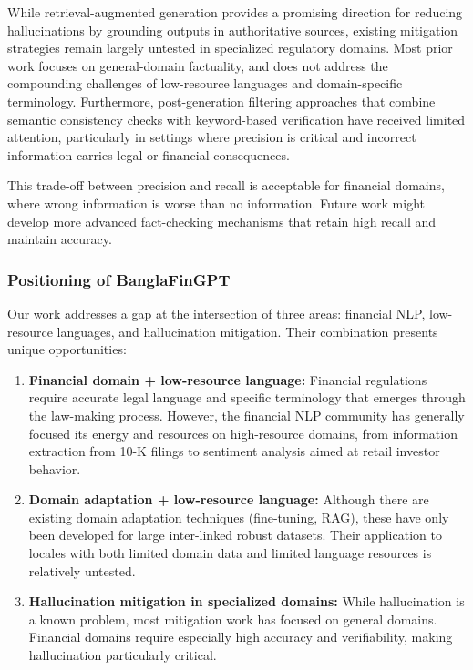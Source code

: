 \documentclass{article}
\begin{document}
While retrieval-augmented generation provides a promising direction for reducing
hallucinations by grounding outputs in authoritative sources, existing mitigation
strategies remain largely untested in specialized regulatory domains. Most prior work
focuses on general-domain factuality, and does not address the compounding challenges
of low-resource languages and domain-specific terminology. Furthermore,
post-generation filtering approaches that combine semantic consistency checks with
keyword-based verification have received limited attention, particularly in settings
where precision is critical and incorrect information carries legal or financial
consequences.

This trade-off between precision and recall is acceptable for financial domains, where
wrong information is worse than no information. Future work might develop more advanced
fact-checking mechanisms that retain high recall and maintain accuracy.

\subsubsection{Positioning of BanglaFinGPT}

Our work addresses a gap at the intersection of three areas: financial NLP,
low-resource languages, and hallucination mitigation. Their combination presents unique
opportunities:

\begin{enumerate}
\item \textbf{Financial domain + low-resource language:} Financial regulations require
accurate legal language and specific terminology that emerges through the law-making
process. However, the financial NLP community has generally focused its energy and
resources on high-resource domains, from information extraction from 10-K filings to
sentiment analysis aimed at retail investor behavior.

\item \textbf{Domain adaptation + low-resource language:} Although there are existing
domain adaptation techniques (fine-tuning, RAG), these have only been developed for
large inter-linked robust datasets. Their application to locales with both limited
domain data and limited language resources is relatively untested.

\item \textbf{Hallucination mitigation in specialized domains:} While hallucination is
a known problem, most mitigation work has focused on general domains. Financial domains
require especially high accuracy and verifiability, making hallucination particularly
critical.
\end{enumerate}
\end{document}
